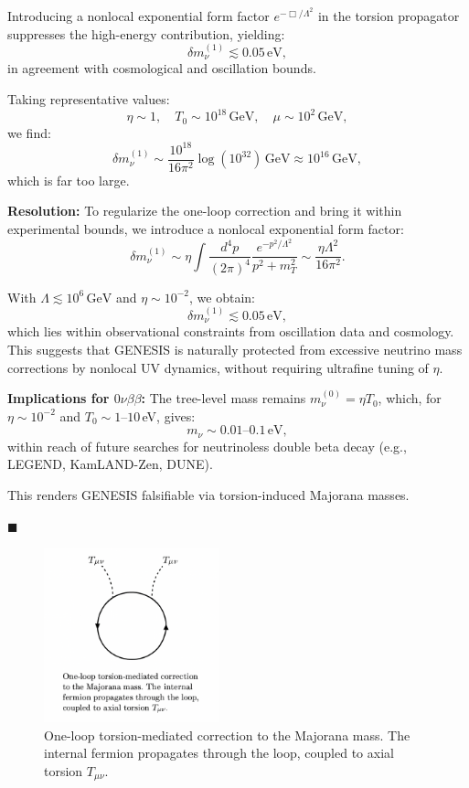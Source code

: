 \documentclass{article}
\begin{document}
Introducing a nonlocal exponential form factor \( e^{-\Box/\Lambda^2} \) in the torsion propagator suppresses the high-energy contribution, yielding:
\[
\delta m_\nu^{(1)} \lesssim 0.05\,\mathrm{eV},
\]
in agreement with cosmological and oscillation bounds.


Taking representative values:
\[
\eta \sim 1, \quad T_0 \sim 10^{18}\,\text{GeV}, \quad \mu \sim 10^{2}\,\text{GeV},
\]
we find:
\[
\delta m_\nu^{(1)} \sim \frac{10^{18}}{16\pi^2} \log(10^{32})\,\text{GeV} \approx 10^{16}\,\text{GeV},
\]
which is far too large.

\noindent \textbf{Resolution:}  
To regularize the one-loop correction and bring it within experimental bounds, we introduce a nonlocal exponential form factor:
\[
\delta m_\nu^{(1)} \sim \eta \int \frac{d^4p}{(2\pi)^4}
\frac{e^{-p^2/\Lambda^2}}{p^2 + m_T^2} \sim \frac{\eta \Lambda^2}{16\pi^2}.
\]

With $\Lambda \lesssim 10^6\,\mathrm{GeV}$ and $\eta \sim 10^{-2}$, we obtain:
\[
\delta m_\nu^{(1)} \lesssim 0.05\,\mathrm{eV},
\]
which lies within observational constraints from oscillation data and cosmology. This suggests that GENESIS is naturally protected from excessive neutrino mass corrections by nonlocal UV dynamics, without requiring ultrafine tuning of $\eta$.

\medskip

\noindent \textbf{Implications for $0\nu\beta\beta$:}  
The tree-level mass remains $m_\nu^{(0)} = \eta T_0$, which, for $\eta \sim 10^{-2}$ and $T_0 \sim 1$–$10$ eV, gives:
\[
m_\nu \sim 0.01\text{–}0.1\,\text{eV},
\]
within reach of future searches for neutrinoless double beta decay (e.g., LEGEND, KamLAND-Zen, DUNE).

This renders GENESIS falsifiable via torsion-induced Majorana masses.

\hfill $\blacksquare$


\begin{figure}[h!]
\centering
\includegraphics[width=0.45\textwidth]{neutrino_loop.png}
\caption{One-loop torsion-mediated correction to the Majorana mass.
The internal fermion propagates through the loop, coupled to axial torsion \(T_{\mu\nu}\).}
\label{fig:neutrino_loop}
\end{figure}
\end{document}
